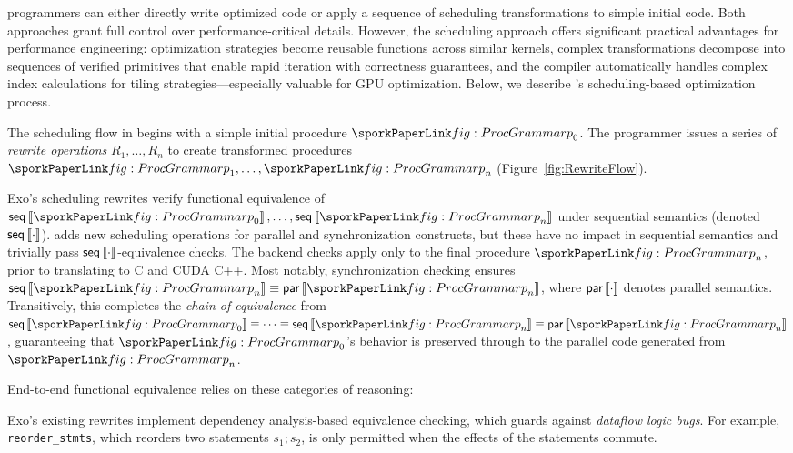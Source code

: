 
\sporkName{} programmers can either directly write optimized code or apply a sequence of scheduling transformations to simple initial code.
Both approaches grant full control over performance-critical details.
However, the scheduling approach offers significant practical advantages for performance engineering:
optimization strategies become reusable functions across similar kernels, complex transformations decompose into sequences of verified primitives that enable rapid iteration with correctness guarantees, and the compiler automatically handles complex index calculations for tiling strategies---especially valuable for GPU optimization.
Below, we describe \sporkName{}'s scheduling-based optimization process.

The scheduling flow in \sporkName{} begins with a simple initial procedure $\sporkp_0$.
The programmer issues a series of \emph{rewrite operations} $R_1, \ldots, R_n$ to create transformed procedures $\sporkp_1, \ldots, \sporkp_n$ (Figure~\ref{fig:RewriteFlow}).



Exo's scheduling rewrites verify functional equivalence of $\sporkseqInterp{\sporkp_0}, \ldots, \sporkseqInterp{\sporkp_n}$ under sequential semantics (denoted $\textsf{seq}\left\llbracket \cdot \right\rrbracket$).
\sporkName{} adds new scheduling operations for parallel and synchronization constructs, but these have no impact in sequential semantics and trivially pass $\textsf{seq}\left\llbracket \cdot \right\rrbracket$-equivalence checks.
The backend checks apply only to the final procedure $\sporkp_n$, prior to translating to C and CUDA C++.
Most notably, synchronization checking ensures $\sporkseqInterp{\sporkp_n} \equiv \sporkparInterp{\sporkp_n}$, where $\textsf{par}\left\llbracket \cdot \right\rrbracket$ denotes parallel semantics.
Transitively, this completes the \emph{chain of equivalence} from $\sporkseqInterp{\sporkp_0} \equiv \cdots \equiv \sporkseqInterp{\sporkp_n} \equiv \sporkparInterp{\sporkp_n}$, guaranteeing that $\sporkp_0$'s behavior is preserved through to the parallel code generated from $\sporkp_n$.

End-to-end functional equivalence relies on these categories of reasoning:

Exo's existing rewrites implement dependency analysis-based equivalence checking, which guards against \emph{dataflow logic bugs}.
For example, \texttt{reorder\_stmts}, which reorders two statements $s_1;s_2$, is only permitted when the effects of the statements commute.

